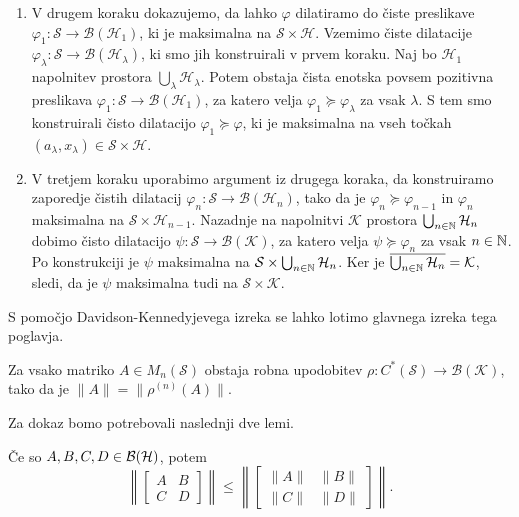 \begin{dokaz}
\begin{enumerate}
        \item V drugem koraku dokazujemo, da lahko $\varphi$ dilatiramo do čiste preslikave $\varphi_1 : \mathcal{S} \to \mathcal{B} (\mathcal{H}_1)$,
        ki je maksimalna na $\mathcal{S} \times \mathcal{H}$. 
        Vzemimo čiste dilatacije $\varphi_\lambda: \mathcal{S} \to \mathcal{B}(\mathcal{H}_\lambda)$, ki smo jih konstruirali v prvem koraku.
        Naj bo $\mathcal{H}_1$ napolnitev prostora $\bigcup_{\lambda} \mathcal{H}_\lambda$. 
        Potem obstaja čista enotska povsem pozitivna preslikava $\varphi_1: \mathcal{S} \to \mathcal{B}(\mathcal{H}_1)$,
        za katero velja $\varphi_1 \succeq \varphi_\lambda$ za vsak $\lambda$. S tem smo konstruirali čisto dilatacijo $\varphi_1 \succeq \varphi$,
        ki je maksimalna na vseh točkah $(a_\lambda, x_\lambda) \in \mathcal{S} \times \mathcal{H}$.

        \item V tretjem koraku uporabimo argument iz drugega koraka, da konstruiramo zaporedje čistih dilatacij
        $\varphi_n: \mathcal{S} \to \mathcal{B}(\mathcal{H}_n)$,
        tako da je $\varphi_n \succeq \varphi_{n - 1}$ in $\varphi_n$ maksimalna na $\mathcal{S} \times \mathcal{H}_{n - 1}$.
        Nazadnje na napolnitvi $\mathcal{K}$ prostora $\bigcup_{n \in \mathbb N} \mathcal{H}_n$
        dobimo čisto dilatacijo $\psi: \mathcal{S} \to \mathcal{B}(\mathcal{K})$, za katero velja $\psi \succeq \varphi_n$ za vsak $n \in \mathbb N$.
        Po konstrukciji je $\psi$ maksimalna na $\mathcal{S} \times \bigcup_{n \in \mathbb N} \mathcal{H}_n$.
        Ker je $\overline{\bigcup_{n \in \mathbb N} \mathcal{H}_n} = \mathcal{K}$, sledi, da je $\psi$ maksimalna tudi na $\mathcal{S} \times \mathcal{K}$. \qedhere
    \end{enumerate}
\end{dokaz}

S pomočjo Davidson-Kennedyjevega izreka se lahko lotimo glavnega izreka tega poglavja.

\begin{izrek}\label{izr:2.4}
    Za vsako matriko $A \in M_n (\mathcal{S})$ obstaja robna upodobitev $\rho: C^*(\mathcal{S}) \to \mathcal{B}(\mathcal{K})$,
    tako da je $\| A\| = \|\rho^{(n)} (A) \|$.
\end{izrek}

Za dokaz bomo potrebovali naslednji dve lemi.

\begin{lema}
    Če so $A, B, C, D \in \operatorname{\mathcal{B} (\mathcal{H})}$, potem
    $$\left\| \begin{bmatrix}
        A & B\\
        C & D
    \end{bmatrix} \right\| \leq \left\| \begin{bmatrix}
        \| A\| & \| B\| \\
         \|C\| & \|D\|
    \end{bmatrix} \right\|.$$
\end{lema}

